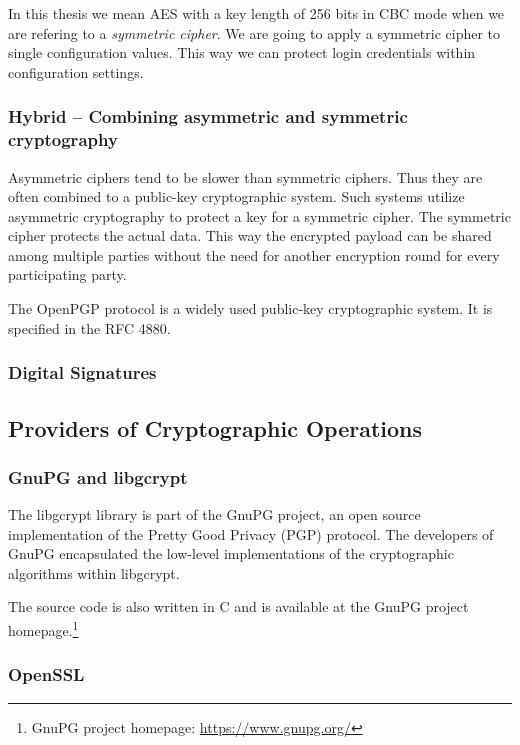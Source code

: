 In this thesis we mean AES with a key length of 256 bits in CBC mode when we are refering to a \emph{symmetric cipher}.
We are going to apply a symmetric cipher to single configuration values.
This way we can protect login credentials within configuration settings.

\subsubsection{Hybrid -- Combining asymmetric and symmetric cryptography}

Asymmetric ciphers tend to be slower than symmetric ciphers.
Thus they are often combined to a public-key cryptographic system.
Such systems utilize asymmetric cryptography to protect a key for a symmetric cipher.
The symmetric cipher protects the actual data.
This way the encrypted payload can be shared among multiple parties without the need for another encryption round for every participating party.\cite{stallings2014} 

The OpenPGP protocol is a widely used public-key cryptographic system.
It is specified in the RFC 4880.\cite{rfc4880}



\subsubsection{Digital Signatures}


\subsection{Providers of Cryptographic Operations}

  \subsubsection{GnuPG and libgcrypt}




The libgcrypt library is part of the GnuPG project, an open source implementation of the Pretty Good Privacy (PGP) protocol.
The developers of GnuPG encapsulated the low-level implementations of the cryptographic algorithms within libgcrypt.

The source code is also written in C and is available at the GnuPG project homepage.\footnote{GnuPG project homepage: \url{https://www.gnupg.org/}}

  \subsubsection{OpenSSL}

